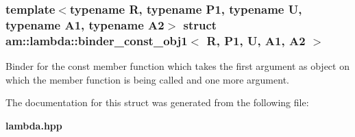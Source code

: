 \subsubsection*{template$<$typename R, typename P1, typename U, typename A1, typename A2$>$ struct am::lambda::binder\_\-const\_\-obj1$<$ R, P1, U, A1, A2 $>$}

Binder for the const member function which takes the first argument as object on which the member function is being called and one more argument. 



The documentation for this struct was generated from the following file:\begin{CompactItemize}
\item 
{\bf lambda.hpp}\end{CompactItemize}
